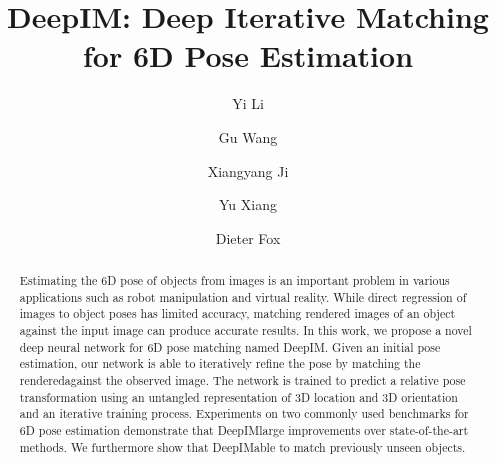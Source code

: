 \documentclass[twocolumn]{svjour3}
\newcommand{\dimnet}[0]{DeepIM}
\newcommand{\rend}[0]{rendered}
\begin{document}
\title{DeepIM: Deep Iterative Matching for 6D Pose Estimation} %


\author{Yi Li \and Gu Wang \and Xiangyang Ji \and Yu Xiang \and Dieter Fox}

\maketitle

\begin{abstract}

Estimating the 6D pose of objects from images is an important problem in various applications such as robot manipulation and virtual reality. While direct regression of images to object poses has limited accuracy, matching rendered images of an object against the input image can produce accurate results. In this work, we propose a novel deep neural network for 6D pose matching named \dimnet. Given an initial pose estimation, our network is able to iteratively refine the pose by matching the \rend\image against the observed image. The network is trained to predict a relative pose transformation using an untangled representation of 3D location and 3D orientation and an iterative training process. Experiments on two commonly used benchmarks for 6D pose estimation demonstrate that \dimnet \achieves large improvements over state-of-the-art methods. We furthermore show that \dimnet\is able to match previously unseen objects.

\end{abstract}
\end{document}
